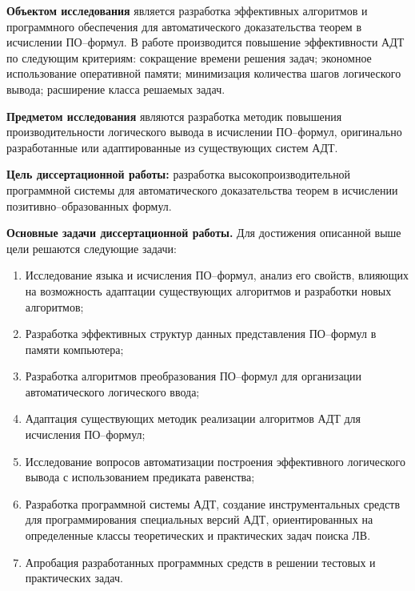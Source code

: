 \documentclass[a4paper]{report}
\begin{document}

\textbf{Объектом исследования} является разработка эффективных алгоритмов и программного обеспечения для автоматического доказательства теорем в исчислении ПО--формул. В работе производится повышение эффективности АДТ по следующим критериям: сокращение времени решения задач; экономное использование оперативной памяти; минимизация количества шагов логического вывода; расширение класса решаемых задач.

\textbf{Предметом исследования} являются разработка методик повышения производительности логического вывода в исчислении ПО--формул, оригинально разработанные или адаптированные из существующих систем АДТ.

\textbf{Цель диссертационной работы:} разработка высокопроизводительной программной системы для автоматического доказательства теорем в исчислении позитивно--образованных формул.

\textbf{Основные задачи диссертационной работы.}
Для достижения описанной выше цели решаются следующие задачи:
\begin{enumerate}
\item Исследование языка и исчисления ПО--формул, анализ его свойств, влияющих на возможность адаптации существующих алгоритмов и разработки новых алгоритмов;
\item Разработка эффективных структур данных представления ПО--формул в памяти компьютера;
\item Разработка алгоритмов преобразования ПО--формул для организации автоматического логического ввода;
\item Адаптация существующих методик реализации алгоритмов АДТ для исчисления ПО--формул;
\item Исследование вопросов автоматизации построения эффективного логического вывода с использованием предиката равенства;
\item Разработка программной системы АДТ, создание инструментальных средств для программирования специальных версий АДТ, ориентированных на определенные классы теоретических и практических задач поиска ЛВ.
\item Апробация разработанных программных средств в решении тестовых и практических задач.
\end{enumerate}
\end{document}
